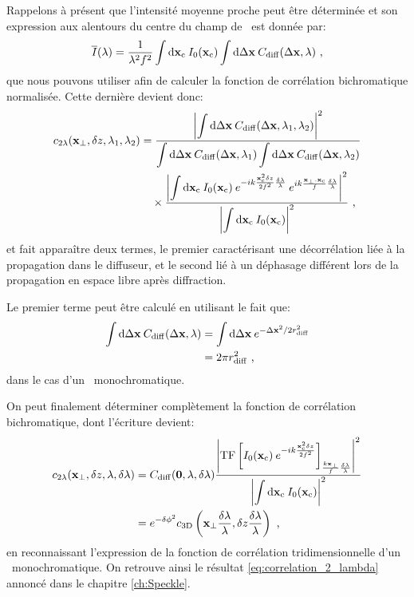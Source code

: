 Rappelons à présent que l'intensité moyenne proche peut être déterminée et son expression aux alentours du centre du champ de \speckle\ est donnée par:
\begin{equation}
\overline{I}(\lambda)= \frac{1}{\lambda^2 f^2} \int{\mathop{}\mathopen{}\mathrm{d}\mathbf{x}_{\mathrm{c}}\: I_0(\mathbf{x}_{\mathrm{c}})} \int{\mathop{}\mathopen{}\mathrm{d}\Delta\mathbf{x}\: C_{\mathrm{diff}}(\Delta\mathbf{x},\lambda)} \text{ ,}
\end{equation}
que nous pouvons utiliser afin de calculer la fonction de corrélation bichromatique normalisée. Cette dernière devient donc:
\begin{align}
c_{2\lambda}(\mathbf{x}_{\perp},\delta z,\lambda_1,\lambda_2) &= \frac{\left| \displaystyle\int{\mathop{}\mathopen{}\mathrm{d}\Delta\mathbf{x}\: C_{\mathrm{diff}}(\Delta\mathbf{x},\lambda_1,\lambda_2)}\right|^2}{\displaystyle\int{\mathop{}\mathopen{}\mathrm{d}\Delta\mathbf{x}\: C_{\mathrm{diff}}(\Delta\mathbf{x},\lambda_1)}\displaystyle\int{\mathop{}\mathopen{}\mathrm{d}\Delta\mathbf{x}\: C_{\mathrm{diff}}(\Delta\mathbf{x},\lambda_2)}} \\
&\nonumber \quad\times \frac{\left|\displaystyle\int{\mathop{}\mathopen{}\mathrm{d}\mathbf{x}_{\mathrm{c}}\: I_0(\mathbf{x}_{\mathrm{c}}) \: e^{-ik \frac{\mathbf{x}_{\mathrm{c}}^2 \delta z}{2f^2} \frac{\delta\lambda}{\lambda}} \: e^{ik\frac{\mathbf{x}_{\perp}.\mathbf{x}_{\mathrm{c}}}{f} \frac{\delta\lambda}{\lambda}}} \right|^2}{\left|\displaystyle\int{\mathop{}\mathopen{}\mathrm{d}\mathbf{x}_{\mathrm{c}}\: I_0(\mathbf{x}_{\mathrm{c}})} \right|^2} \text{ ,}
\end{align}
et fait apparaître deux termes, le premier caractérisant une décorrélation liée à la propagation dans le diffuseur, et le second lié à un déphasage différent lors de la propagation en espace libre après diffraction.

Le premier terme peut être calculé en utilisant le fait que:
\begin{align}
\int{\mathop{}\mathopen{}\mathrm{d}\Delta\mathbf{x}\: C_{\mathrm{diff}}(\Delta\mathbf{x},\lambda)} &= \int{\mathop{}\mathopen{}\mathrm{d}\Delta\mathbf{x}\: e^{-\Delta\mathbf{x}^2/2r_{\mathrm{diff}}^2}} \\
&= 2\pi r_{\mathrm{diff}}^2 \text{ ,}
\end{align}
dans le cas d'un \speckle\ monochromatique.

On peut finalement déterminer complètement la fonction de corrélation bichromatique, dont l'écriture devient:
\begin{align}
c_{2\lambda}(\mathbf{x}_{\perp},\delta z,\lambda,\delta\lambda) &= C_{\mathrm{diff}}(\mathbf{0},\lambda,\delta\lambda) \frac{\left| \mathrm{TF} \left[ I_0(\mathbf{x}_{\mathrm{c}}) \: e^{-ik\frac{\mathbf{x}_{\mathrm{c}}^2 \delta z}{2f^2}}\right]_{\frac{k\mathbf{x}_{\perp}}{f} \frac{\delta\lambda}{\lambda}}\right|^2}{\left|\displaystyle\int{\mathop{}\mathopen{}\mathrm{d}\mathbf{x}_{\mathrm{c}}\: I_0(\mathbf{x}_{\mathrm{c}})} \right|^2}\\
&= e^{-\delta\phi^2} c_{\mathrm{3D}}\left(\mathbf{x}_{\perp} \frac{\delta\lambda}{\lambda}, \delta z \frac{\delta\lambda}{\lambda}\right) \text{ ,}
\end{align}
en reconnaissant l'expression de la fonction de corrélation tridimensionnelle d'un \speckle\ monochromatique. On retrouve ainsi le résultat \ref{eq:correlation_2_lambda} annoncé dans le chapitre \ref{ch:Speckle}.